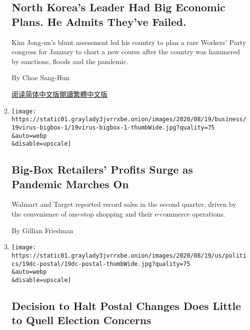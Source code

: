 \begin{enumerate}
{  \subsection{North Korea's Leader Had Big Economic Plans. He Admits
  They've
  Failed.}\label{north-koreas-leader-had-big-economic-plans-he-admits-theyve-failed}}

  Kim Jong-un's blunt assessment led his country to plan a rare Workers'
  Party congress for January to chart a new course after the country was
  hammered by sanctions, floods and the pandemic.

  By Choe Sang-Hun

  \href{https://cn.nytimes3xbfgragh.onion/asia-pacific/20200821/north-korea-economy-coronavirus/}{阅读简体中文版}\href{https://cn.nytimes3xbfgragh.onion/asia-pacific/20200821/north-korea-economy-coronavirus/zh-hant/}{閱讀繁體中文版}
\item
  \href{/2020/08/19/business/coronavirus-walmart-target-home-depot.html}{}

  \texttt{[image: https://static01.graylady3jvrrxbe.onion/images/2020/08/19/business/19virus-bigbox-1/19virus-bigbox-1-thumbWide.jpg?quality=75\\\&auto=webp\\\&disable=upscale]}

  \hypertarget{big-box-retailers-profits-surge-as-pandemic-marches-on}{%
  \subsection{Big-Box Retailers' Profits Surge as Pandemic Marches
  On}\label{big-box-retailers-profits-surge-as-pandemic-marches-on}}

  Walmart and Target reported record sales in the second quarter, driven
  by the convenience of one-stop shopping and their e-commerce
  operations.

  By Gillian Friedman
\item
  \href{/2020/08/19/business/economy/postal-service-changes-dejoy.html}{}

  \texttt{[image: https://static01.graylady3jvrrxbe.onion/images/2020/08/19/us/politics/19dc-postal/19dc-postal-thumbWide.jpg?quality=75\\\&auto=webp\\\&disable=upscale]}

  \hypertarget{decision-to-halt-postal-changes-does-little-to-quell-election-concerns}{%
  \subsection{Decision to Halt Postal Changes Does Little to Quell
  Election
  Concerns}\label{decision-to-halt-postal-changes-does-little-to-quell-election-concerns}}


\end{enumerate}
